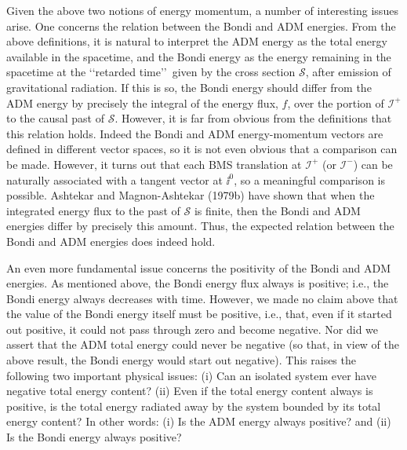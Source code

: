 Given the above two notions of energy momentum, a number of interesting issues
arise. One concerns the relation between the Bondi and ADM energies. From the above
definitions, it is natural to interpret the ADM energy as the total energy available in
the spacetime, and the Bondi energy as the energy remaining in the spacetime at the
\lq\lq retarded time\rq\rq\ given by the cross section \(\mathcal S\), after emission of
gravitational radiation. If this is so, the Bondi energy should differ from the ADM
energy by precisely the integral of the energy flux, \(f\), over the portion of
\(\mathcal I^+\) to the causal past of \(\mathcal S\). However, it is far from obvious
from the definitions that this relation holds. Indeed the Bondi and ADM
energy-momentum vectors are defined in different vector spaces, so it is not even
obvious that a comparison can be made. However, it turns out that each BMS
translation at \(\mathcal I^+\) (or \(\mathcal I^-\)) can be naturally associated with a
tangent vector at \(\ii^0\), so a meaningful comparison is possible. Ashtekar and
Magnon-Ashtekar (1979b) have shown that when the integrated energy flux to the
past of \(\mathcal S\) is finite, then the Bondi and ADM energies differ by precisely
this amount. Thus, the expected relation between the Bondi and ADM energies does
indeed hold.

An even more fundamental issue concerns the positivity of the Bondi and ADM
energies. As mentioned above, the Bondi energy flux always is positive; i.e., the
Bondi energy always decreases with time. However, we made no claim above that the
value of the Bondi energy itself must be positive, i.e., that, even if it started out
positive, it could not pass through zero and become negative. Nor did we assert that
the ADM total energy could never be negative (so that, in view of the above result,
the Bondi energy would start out negative). This raises the following two important
physical issues: (i) Can an isolated system ever have negative total energy content?
(ii) Even if the total energy content always is positive, is the total energy radiated
away by the system bounded by its total energy content? In other words: (i) Is the
ADM energy always positive? and (ii) Is the Bondi energy always positive?

